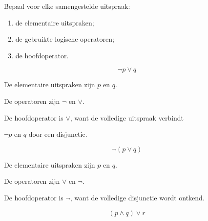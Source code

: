 \documentclass{ximera}
\begin{document}
\begin{oefening}{\oefU \ESS}

Bepaal voor elke samengestelde uitspraak:

\begin{enumerate}

  \item de elementaire uitspraken;

  \item de gebruikte logische operatoren;

  \item de hoofdoperator.

\end{enumerate}



\begin{question}

\[
\neg p\lor q
\]

\begin{oplossing}

De elementaire uitspraken zijn $p$ en $q$.

De operatoren zijn $\neg$ en $\lor$.

De hoofdoperator is $\lor$, want de volledige uitspraak verbindt

$\neg p$ en $q$ door een disjunctie.

\end{oplossing}

\end{question}



\begin{question}

\[
\neg(p\lor q)
\]

\begin{oplossing}

De elementaire uitspraken zijn $p$ en $q$.

De operatoren zijn $\lor$ en $\neg$.

De hoofdoperator is $\neg$, want de volledige disjunctie wordt ontkend.

\end{oplossing}

\end{question}



\begin{question}

\[
(p\land q)\lor r
\]

\begin{oplossing}


\end{oplossing}
\end{question}
\end{oefening}
\end{document}
